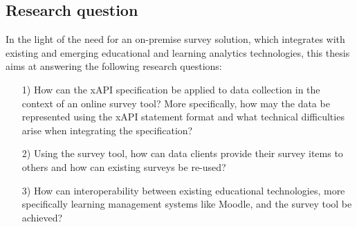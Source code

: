 \subsection{Research question}
    In the light of the need for an on-premise survey solution, which integrates with
    existing and emerging educational and learning analytics technologies, this
    thesis aims at answering the following research questions:

    \begin{itemize}
        \item[1)] How can the xAPI specification be applied to data collection in the context
            of an online survey tool? More specifically, how may the data be represented using
            the xAPI statement format and what technical difficulties arise when integrating the
            specification?
        \item[2)] Using the survey tool, how can data clients provide their survey items to others 
            and how can existing surveys be re-used?
        \item[3)] How can interoperability between existing educational technologies, more specifically
            learning management systems like Moodle, and the survey tool be achieved?
    \end{itemize}
